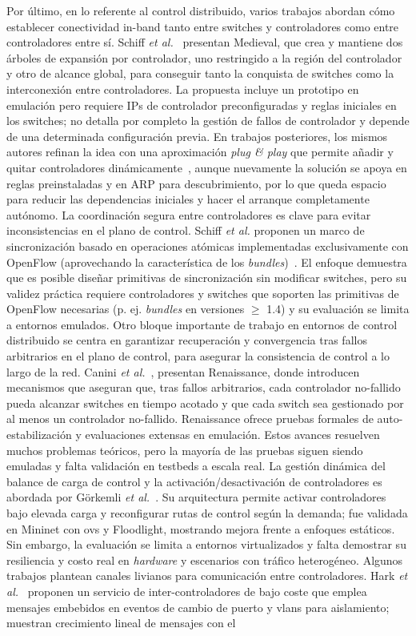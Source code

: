 Por último, en lo referente al control distribuido, varios trabajos abordan cómo establecer conectividad in-band tanto entre switches y controladores como entre controladores entre sí. Schiff \textit{et al.}~\cite{Schiff15} presentan Medieval, que crea y mantiene dos árboles de expansión por controlador, uno restringido a la región del controlador y otro de alcance global, para conseguir tanto la conquista de switches como la interconexión entre controladores. La propuesta incluye un prototipo en emulación pero requiere IPs de controlador preconfiguradas y reglas iniciales en los switches; no detalla por completo la gestión de fallos de controlador y depende de una determinada configuración previa. En trabajos posteriores, los mismos autores refinan la idea con una aproximación \textit{plug \& play} que permite añadir y quitar controladores dinámicamente~\cite{Schiff16-2}, aunque nuevamente la solución se apoya en reglas preinstaladas y en ARP para descubrimiento, por lo que queda espacio para reducir las dependencias iniciales y hacer el arranque completamente autónomo. La coordinación segura entre controladores es clave para evitar inconsistencias en el plano de control. Schiff \textit{et al.} proponen un marco de sincronización basado en operaciones atómicas implementadas exclusivamente con OpenFlow (aprovechando la característica de los \textit{bundles})~\cite{Schiff16}. El enfoque demuestra que es posible diseñar primitivas de sincronización sin modificar switches, pero su validez práctica requiere controladores y switches que soporten las primitivas de OpenFlow necesarias (p. ej. \textit{bundles} en versiones $\geq$ 1.4) y su evaluación se limita a entornos emulados.  Otro bloque importante de trabajo en entornos de control distribuido se centra en garantizar recuperación y convergencia tras fallos arbitrarios en el plano de control, para asegurar la consistencia de control a lo largo de la red. Canini \textit{et al.}~\cite{Canini18,Canini22}, presentan Renaissance, donde introducen mecanismos que aseguran que, tras fallos arbitrarios, cada controlador no-fallido pueda alcanzar switches en tiempo acotado y que cada switch sea gestionado por al menos un controlador no-fallido. Renaissance ofrece pruebas formales de auto-estabilización y evaluaciones extensas en emulación. Estos avances resuelven muchos problemas teóricos, pero la mayoría de las pruebas siguen siendo emuladas y falta validación en testbeds a escala real. La gestión dinámica del balance de carga de control y la activación/desactivación de controladores es abordada por Görkemli \textit{et al.}~\cite{gorkemli2016dynamic}. Su arquitectura permite activar controladores bajo elevada carga y reconfigurar rutas de control según la demanda; fue validada en Mininet con \gls{ovs} y Floodlight, mostrando mejora frente a enfoques estáticos. Sin embargo, la evaluación se limita a entornos virtualizados y falta demostrar su resiliencia y costo real en \textit{hardware} y escenarios con tráfico heterogéneo. Algunos trabajos plantean canales livianos para comunicación entre controladores. Hark \textit{et al.}~\cite{Hark17} proponen un servicio de inter-controladores de bajo coste que emplea mensajes embebidos en eventos de cambio de puerto y \glspl{vlan} para aislamiento; muestran crecimiento lineal de mensajes con el 